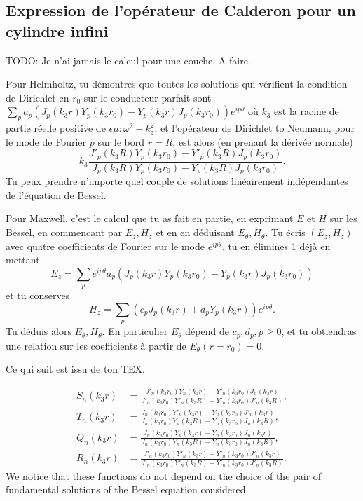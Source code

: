     \subsection{Expression de l'opérateur de Calderon pour un cylindre infini}

        \begin{REM}
            TODO: Je n'ai jamais le calcul pour une couche. A faire.
        \end{REM}
        \begin{REM}
        Pour Helmholtz, tu démontres que toutes les solutions qui vérifient la condition de Dirichlet en \(r_0\) sur le conducteur parfait sont \(\sum_p a_p(J_p(k_3r)Y_p(k_3r_0)-Y_p(k_3r)J_p(k_3r_0))e^{ip\theta}\) où \(k_3\) est la racine de partie réelle positive de \(\epsilon \mu :\omega^2-k_z^2\), et l'opérateur de Dirichlet to Neumann, pour le mode de Fourier \(p\) sur le bord \(r=R\), est alors (en prenant la dérivée normale)
        \[k_3\frac{J'_p(k_3R)Y_p(k_3r_0)-Y'_p(k_3R)J_p(k_3r_0)}{J_p(k_3R)Y_p(k_3r_0)-Y_p(k_3R)J_p(k_3r_0)}.\]
        Tu peux prendre n'importe quel couple de solutions linéairement indépendantes de l'équation de Bessel.
        
        Pour Maxwell, c'est le calcul que tu as fait en partie, en exprimant \(E\) et \(H\) sur les Bessel, en commencant par \(E_z,H_z\) et en en déduisant \(E_{\theta}, H_{\theta}\). Tu écris \((E_z, H_z)\) avec quatre coefficients de Fourier sur le mode \(e^{ip\theta}\), tu en élimines 1 déjà en mettant
        \[E_z=\sum_p e^{ip\theta}a_p(J_p(k_3r)Y_p(k_3r_0)-Y_p(k_3r)J_p(k_3r_0))\]
        et tu conserves
        \[H_z=\sum_p (c_pJ_p(k_3r)+d_pY_p(k_3r))e^{ip\theta}.\]
        Tu déduis alors \(E_{\theta}, H_{\theta}\). En particulier \(E_{\theta}\) dépend de \(c_p, d_p, p\geq 0\), et tu obtiendras une relation sur les coefficients à partir de \(E_{\theta}(r=r_0)=0\). 
        \end{REM}

        \begin{REM}
            Ce qui suit est issu de ton TEX.
        \end{REM}
            \begin{align*}
                S_n(k_3r)&=\frac{J'_n(k_3r_0)Y_n(k_3r)-Y'_n(k_3r_0)J_n(k_3r)}{J'_n(k_3r_0)Y'_n(k_3R)-Y'_n(k_3r_0)J'_n(k_3R)},
                \\
                T_n(k_3r)&=\frac{J_n(k_3r_0)Y'_n(k_3r)-Y_n(k_3r_0)J'_n(k_3r)}{J_n(k_3r_0)Y_n(k_3R)-Y_n(k_3r_0)J_n(k_3R)},
                \\
                Q_n(k_3r)&=\frac{J_n(k_3r_0)Y_n(k_3r)-Y_n(k_3r_0)J_n(k_3r)}{J_n(k_3r_0)Y_n(k_3R)-Y_n(k_3r_0)J_n(k_3R)},
                \\
                R_n(k_3r)&=\frac{J'_n(k_3r_0)Y'_n(k_3r)-Y'_n(k_3r_0)J'_n(k_3r)}{J'_n(k_3r_0)Y'_n(k_3R)-Y'_n(k_3r_0)J'_n(k_3R)}.
            \end{align*}
            We notice that these functions do not depend on the choice of the pair of fundamental solutions of the Bessel equation considered. 

